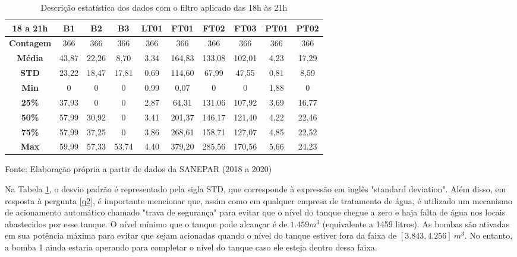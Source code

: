 \begin{table}[H]
	\centering
	\caption{Descrição estatística dos dados com o filtro aplicado das 18h às 21h}\label{tb:est}
	\begin{tabular}{@{}cccccccccc@{}}
		\toprule
		\textbf{18 a 21h}  & \textbf{B1} & \textbf{B2} & \textbf{B3} & \textbf{LT01} & \textbf{FT01} & \textbf{FT02} & \textbf{FT03} & \textbf{PT01} & \textbf{PT02} \\ \midrule
		\textbf{Contagem} & 366         & 366         & 366         & 366           & 366           & 366           & 366           & 366           & 366           \\
		\textbf{Média}    & 43,87       & 22,26       & 8,70        & 3,34          & 164,83        & 133,08        & 102,01        & 4,23          & 17,29         \\
		\textbf{STD}      & 23,22       & 18,47       & 17,81       & 0,69          & 114,60        & 67,99         & 47,55         & 0,81          & 8,59          \\
		\textbf{Min}      & 0           & 0           & 0           & 0,99          & 0,07          & 0             & 0             & 1,88          & 0             \\
		\textbf{25\%}     & 37,93       & 0           & 0           & 2,87          & 64,31         & 131,06        & 107,92        & 3,69          & 16,77         \\
		\textbf{50\%}     & 57,99       & 30,92       & 0           & 3,41          & 201,37        & 146,17        & 121,40        & 4,22          & 22,46         \\
		\textbf{75\%}     & 57,99       & 37,25       & 0           & 3,86          & 268,61        & 158,71        & 127,07        & 4,85          & 22,52         \\
		\textbf{Max}      & 59,99       & 57,33       & 53,74       & 4,40          & 379,20        & 285,56        & 170,56        & 5,66          & 24,23         \\ \bottomrule
	\end{tabular}
	
	Fonte: Elaboração própria a partir de dados da SANEPAR (2018 a 2020)
\end{table}

Na Tabela \ref{tb:est}, o desvio padrão é representado pela sigla STD, que corresponde à expressão em inglês "standard deviation". Além disso, em resposta à pergunta \ref{q2}, é importante mencionar que, assim como em qualquer empresa de tratamento de água, é utilizado um mecanismo de acionamento automático chamado "trava de segurança" para evitar que o nível do tanque chegue a zero e haja falta de água nos locais abastecidos por esse tanque. O nível mínimo que o tanque pode alcançar é de $1.459 m^3$ (equivalente a 1459 litros). As bombas são ativadas em sua potência máxima para evitar que sejam acionadas quando o nível do tanque estiver fora da faixa de $[3.843, 4.256]\ m^3$. No entanto, a bomba 1 ainda estaria operando para completar o nível do tanque caso ele esteja dentro dessa faixa.

